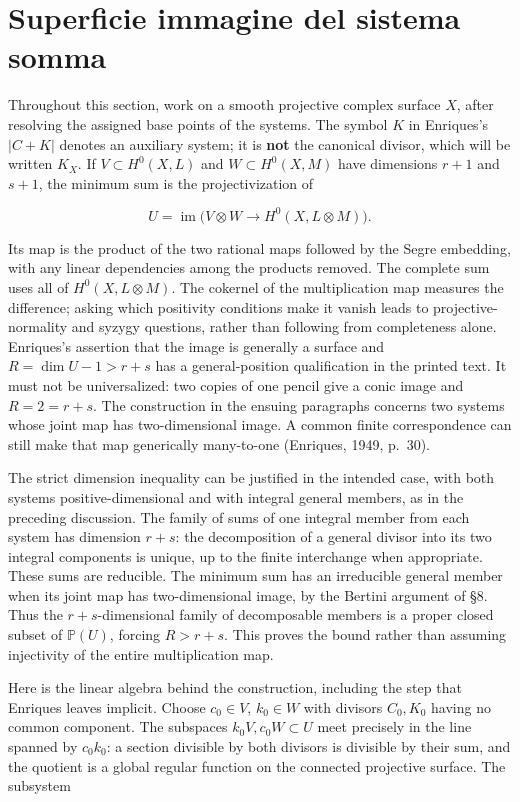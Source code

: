 \section{Superficie immagine del sistema somma}
\label{enriques-I-9}

Throughout this section, work on a smooth projective complex surface \(X\), after resolving the assigned base points of the systems. The symbol \(K\) in Enriques's \(|C+K|\) denotes an auxiliary system; it is \textbf{not} the canonical divisor, which will be written \(K_X\). If \(V\subset H^0(X,L)\) and \(W\subset H^0(X,M)\) have dimensions \(r+1\) and \(s+1\), the minimum sum is the projectivization of

\[
U=\operatorname{im}\bigl(V\otimes W\longrightarrow H^0(X,L\otimes M)\bigr).
\]

Its map is the product of the two rational maps followed by the Segre embedding, with any linear dependencies among the products removed. The complete sum uses all of \(H^0(X,L\otimes M)\). The cokernel of the multiplication map measures the difference; asking which positivity conditions make it vanish leads to projective-normality and syzygy questions, rather than following from completeness alone. Enriques's assertion that the image is generally a surface and \(R=\dim U-1>r+s\) has a general-position qualification in the printed text. It must not be universalized: two copies of one pencil give a conic image and \(R=2=r+s\). The construction in the ensuing paragraphs concerns two systems whose joint map has two-dimensional image. A common finite correspondence can still make that map generically many-to-one (Enriques, 1949, p.~30).

The strict dimension inequality can be justified in the intended case, with both systems positive-dimensional and with integral general members, as in the preceding discussion. The family of sums of one integral member from each system has dimension \(r+s\): the decomposition of a general divisor into its two integral components is unique, up to the finite interchange when appropriate. These sums are reducible. The minimum sum has an irreducible general member when its joint map has two-dimensional image, by the Bertini argument of §8. Thus the \(r+s\)-dimensional family of decomposable members is a proper closed subset of \(\mathbb P(U)\), forcing \(R>r+s\). This proves the bound rather than assuming injectivity of the entire multiplication map.

Here is the linear algebra behind the construction, including the step that Enriques leaves implicit. Choose \(c_0\in V\), \(k_0\in W\) with divisors \(C_0,K_0\) having no common component. The subspaces \(k_0V,c_0W\subset U\) meet precisely in the line spanned by \(c_0k_0\): a section divisible by both divisors is divisible by their sum, and the quotient is a global regular function on the connected projective surface. The subsystem

